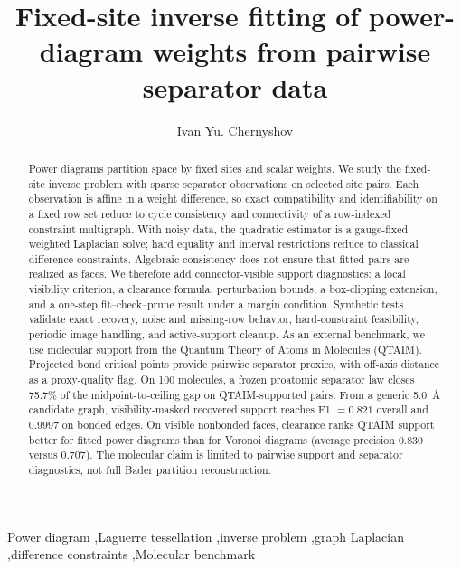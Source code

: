 \documentclass[preprint,12pt]{elsarticle}
\begin{document}
\begin{frontmatter}

\title{Fixed-site inverse fitting of power-diagram weights from pairwise separator data}

\author[aff1]{Ivan Yu. Chernyshov}

\address[aff1]{Advanced Engineering School, ITMO University, St. Petersburg 191002, Russia}

\begin{abstract}
Power diagrams partition space by fixed sites and scalar weights. We study the
fixed-site inverse problem with sparse separator observations on selected site
pairs. Each observation is affine in a weight difference, so exact compatibility
and identifiability on a fixed row set reduce to cycle consistency and
connectivity of a row-indexed constraint multigraph. With noisy data, the
quadratic estimator is a gauge-fixed weighted Laplacian solve; hard equality
and interval restrictions reduce to classical difference constraints. Algebraic
consistency does not ensure that fitted pairs are realized as faces. We
therefore add connector-visible support diagnostics: a local visibility
criterion, a clearance formula, perturbation bounds, a box-clipping extension,
and a one-step fit--check--prune result under a margin condition. Synthetic
tests validate exact recovery, noise and missing-row behavior, hard-constraint
feasibility, periodic image handling, and active-support cleanup. As an
external benchmark, we use molecular support from the Quantum Theory of Atoms in
Molecules (QTAIM). Projected bond critical points provide pairwise separator
proxies, with off-axis distance as a proxy-quality flag. On 100 molecules, a
frozen proatomic separator law closes 75.7\% of the midpoint-to-ceiling gap on
QTAIM-supported pairs. From a generic 5.0~\AA{} candidate graph,
visibility-masked recovered support reaches F1 $=0.821$ overall and $0.9997$ on
bonded edges. On visible nonbonded faces, clearance ranks QTAIM support better
for fitted power diagrams than for Voronoi diagrams (average precision 0.830
versus 0.707). The molecular claim is limited to pairwise support and separator
diagnostics, not full Bader partition reconstruction.

\end{abstract}

\begin{keyword}
Power diagram \sep Laguerre tessellation \sep inverse problem \sep graph Laplacian \sep difference constraints \sep Molecular benchmark
\end{keyword}

\end{frontmatter}
\end{document}
